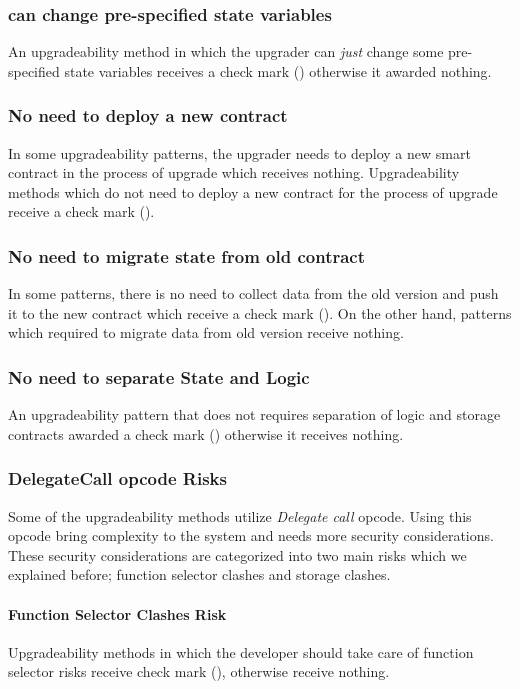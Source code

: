 \subsubsection{can change pre-specified state variables}
An upgradeability method in which the upgrader can \emph{just} change some pre-specified state variables receives a check mark (\checkmark) otherwise it awarded nothing.

\subsubsection{No need to deploy a new contract}
In some upgradeability patterns, the upgrader needs to deploy a new smart contract in the process of upgrade which receives nothing. Upgradeability methods which do not need to deploy a new contract for the process of upgrade receive a check mark (\checkmark).

\subsubsection{No need to migrate state from old contract}
In some patterns, there is no need to collect data from the old version and push it to the new contract which receive a check mark (\checkmark). On the other hand, patterns which required to migrate data from old version receive nothing.

\subsubsection{No need to separate State and Logic}
An upgradeability pattern that does not requires separation of logic and storage contracts awarded a check mark (\checkmark) otherwise it receives nothing.


\subsubsection{DelegateCall opcode Risks}
Some of the upgradeability methods utilize \textit{Delegate call} opcode. Using  this opcode bring complexity to the system and needs more security considerations. These security considerations are categorized into two main risks which we explained before; function selector clashes and storage clashes.

\paragraph{Function Selector Clashes Risk}
Upgradeability methods in which the developer should take care of function selector risks receive check mark (\checkmark), otherwise receive nothing. 

